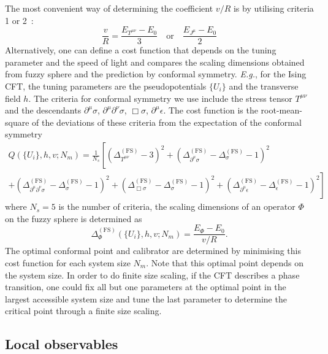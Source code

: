 \documentclass{timesjhep}
\begin{document}
The most convenient way of determining the coefficient $v/R$ is by utilising criteria 1 or 2~: 
\begin{equation}
    \frac{v}{R}=\frac{E_{T^{\mu\nu}}-E_0}{3}\quad\textrm{or}\quad\frac{E_{J^\mu}-E_0}{2}
\end{equation}
Alternatively, one can define a cost function that depends on the tuning parameter and the speed of light and compares the scaling dimensions obtained from fuzzy sphere and the prediction by conformal symmetry. \textit{E.g.}, for the Ising CFT, the tuning parameters are the pseudopotentials $\{U_i\}$ and the transverse field $h$. The criteria for conformal symmetry we use include the stress tensor $T^{\mu\nu}$ and the descendants $\partial^\mu\sigma$, $\partial^\mu\partial^\nu\sigma$, $\Box\sigma$, $\partial^\mu\epsilon$. The cost function is the root-mean-square of the deviations of these criteria from the expectation of the conformal symmetry 
\begin{multline}
    Q(\{U_i\},h,v;N_m)=\frac{1}{N_s}\left[(\Delta_{T^{\mu\nu}}^{(\mathrm{FS})}-3)^2+(\Delta_{\partial^\mu\sigma}^{(\mathrm{FS})}-\Delta_\sigma^{(\mathrm{FS})}-1)^2\right.\\
    \left.+(\Delta_{\partial^\mu\partial^\nu\sigma}^{(\mathrm{FS})}-\Delta_\sigma^{(\mathrm{FS})}-1)^2+(\Delta_{\Box\sigma}^{(\mathrm{FS})}-\Delta_\sigma^{(\mathrm{FS})}-1)^2+(\Delta_{\partial^\mu\epsilon}^{(\mathrm{FS})}-\Delta_\epsilon^{(\mathrm{FS})}-1)^2\right]
\end{multline} 
where $N_s=5$ is the number of criteria, the scaling dimensions of an operator $\Phi$ on the fuzzy sphere is determined as 
\begin{equation}
    \Delta_\Phi^{(\mathrm{FS})}(\{U_i\},h,v;N_m)=\frac{E_\Phi-E_0}{v/R}. 
\end{equation} 
The optimal conformal point and calibrator are determined by minimising this cost function for each system size $N_m$. Note that this optimal point depends on the system size. In order to do finite size scaling, if the CFT describes a phase transition, one could fix all but one parameters at the optimal point in the largest accessible system size and tune the last parameter to determine the critical point through a finite size scaling. 

\subsection{Local observables}
\end{document}
